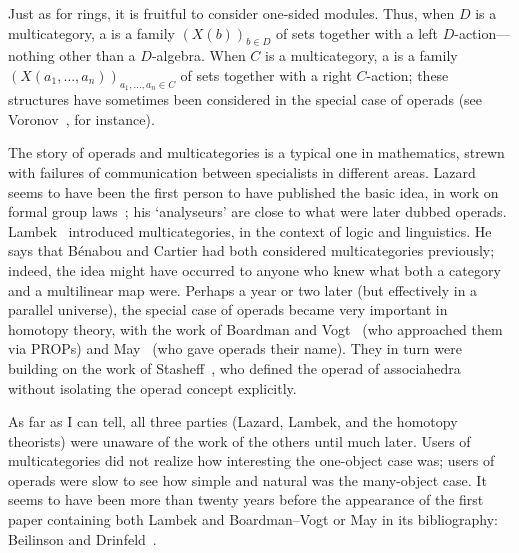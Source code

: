 Just as for rings, it is fruitful to consider one-sided modules.  Thus,
when $D$ is a multicategory, a  is a family
$(X(b))_{b\in D}$ of sets together with a left $D$-action---nothing other
than a $D$-algebra.  When $C$ is a multicategory, a  is a family $(X(a_1, \ldots, a_n))_{a_1, \ldots, a_n \in C}$ of
sets together with a right $C$-action; these structures have sometimes been
considered in the special case of operads (see Voronov~\cite[\S 1]{VorSCO},
for instance).






\begin{notes}

The story of operads%
%
%
and multicategories%
%
%
is a typical one in mathematics,
strewn with failures of communication between specialists in different
areas.  Lazard%
%
%
seems to have been the first person to have published the
basic idea, in work on formal group laws~\cite{Laz}; his `analyseurs'%
%
%
are close to what were later dubbed operads.  Lambek~\cite{LamDSCII}
introduced multicategories, in the context of logic and linguistics.  He
says that B\'enabou%
%
%
and Cartier%
%
%
had both considered multicategories previously;
indeed, the idea might have occurred to anyone who knew what both a
category and a multilinear map were.  Perhaps a year or two later (but
effectively in a parallel universe), the special case of operads became
very important in homotopy theory, with the work of Boardman%
%
%
and
Vogt~\cite{BV}%
%
%
(who approached them via PROPs) and May~\cite{MayGIL}%
%
%
(who
gave operads their name).  They in turn were building on the work of
Stasheff~\cite{StaHAHI},%
%
%
who defined the operad of associahedra without
isolating the operad concept explicitly.

As far as I can tell, all three parties (Lazard, Lambek, and the homotopy
theorists) were unaware of the work of the others until much later.  Users
of multicategories did not realize how interesting the one-object case was;
users of operads were slow to see how simple and natural was the
many-object case.  It seems to have been more than twenty years before the
appearance of the first paper containing both Lambek and Boardman--Vogt or
May in its bibliography: Beilinson%
%
%
and Drinfeld~\cite{BeDr}.%
%
%
 


\end{notes}
